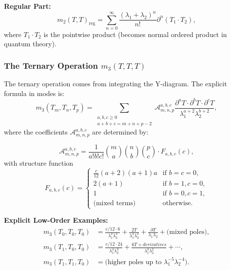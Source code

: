 \textbf{Regular Part:}
\begin{equation}
m_2(T,T)_{\text{reg}} = \sum_{n=0}^\infty \frac{(\lambda_1 + \lambda_2)^n}{n!} \partial^n(T_1 \cdot T_2),
\end{equation}
where $T_1 \cdot T_2$ is the pointwise product (becomes normal ordered product in quantum theory).

\subsubsection{The Ternary Operation $m_3(T,T,T)$}

The ternary operation comes from integrating the Y-diagram. The explicit formula in modes is:
\begin{equation}
m_3(T_m, T_n, T_p) = \sum_{\substack{a,b,c \geq 0 \\ a+b+c = m+n+p-2}} \mathcal{A}_{m,n,p}^{a,b,c} \frac{\partial^a T \cdot \partial^b T \cdot \partial^c T}{\lambda_1^{a+2} \lambda_2^{b+2}},
\end{equation}
where the coefficients $\mathcal{A}_{m,n,p}^{a,b,c}$ are determined by:

\begin{equation}
\mathcal{A}_{m,n,p}^{a,b,c} = \frac{1}{a! b! c!} \binom{m}{a} \binom{n}{b} \binom{p}{c} \cdot F_{a,b,c}(c),
\end{equation}
with structure function
\begin{equation}
F_{a,b,c}(c) = \begin{cases}
\frac{c}{12}(a+2)(a+1)a & \text{if } b=c=0,\\
2(a+1) & \text{if } b=1, c=0,\\
1 & \text{if } b=0, c=1,\\
\text{(mixed terms)} & \text{otherwise}.
\end{cases}
\end{equation}

\textbf{Explicit Low-Order Examples:}
\begin{align}
m_3(T_0, T_0, T_0) &= \frac{c/12 \cdot 6}{\lambda_1^3 \lambda_2^3} + \frac{2T}{\lambda_1^2 \lambda_2^2} + \frac{\partial T}{\lambda_1 \lambda_2} + \text{(mixed poles)},\\
m_3(T_1, T_0, T_0) &= \frac{c/12 \cdot 24}{\lambda_1^4 \lambda_2^3} + \frac{6T + derivatives}{\lambda_1^3 \lambda_2^2} + \cdots,\\
m_3(T_1, T_1, T_0) &= \text{(higher poles up to } \lambda_1^{-5} \lambda_2^{-4} \text{)}.
\end{align}

